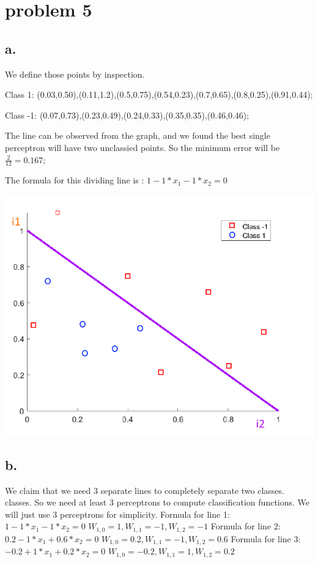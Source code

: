 \documentclass[12pt, letterpaper]{article}
\begin{document}
	\section{problem 5}
	\subsection{a.}
	
	We define those points by inspection.
	
	Class 1: (0.03,0.50),(0.11,1.2),(0.5,0.75),(0.54,0.23),(0.7,0.65),(0.8,0.25),(0.91,0.44);
	
	Class -1: (0.07,0.73),(0.23,0.49),(0.24,0.33),(0.35,0.35),(0.46,0.46);
	
	The line can be observed from the graph, and we found the best single perceptron will have two unclassied points. So the minimum error will be
	$\frac{2}{12}= 0.167; $
	
	The formula for this dividing line is : $1-1*x_{1}-1*x_{2}=0$
	
	\includegraphics[scale=0.6]{"problem-5a"}
	
	\subsection{b.}
	
	We claim that we need 3 separate lines to completely separate two classes. classes. So we need at least 3 perceptrons
	to compute classification functions. We will just use 3 perceptrons for simplicity.\newline
	\newline
	Formula for line 1:\newline
	$1-1*x_{1}-1*x_{2}=0$\newline
	$W_{1,0}=1,W_{1,1}=-1,W_{1,2}=-1$\newline
	Formula for line 2:\newline
	$0.2-1*x_{1}+0.6*x_{2}=0$\newline
	$W_{1,0}=0.2,W_{1,1}=-1,W_{1,2}=0.6$\newline
	Formula for line 3:\newline
	$-0.2+1*x_{1}+0.2*x_{2}=0$\newline
	$W_{1,0}=-0.2,W_{1,1}=1,W_{1,2}=0.2$\newline
	
\end{document}
